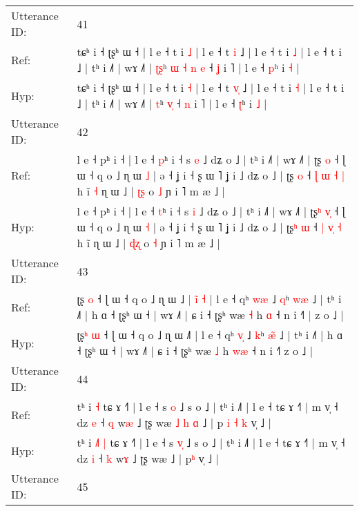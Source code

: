 \documentclass[10pt]{article}
\DeclareRobustCommand{\hl}[1]{{\textcolor{red}{#1}}}
\begin{document}
\begin{longtable}{ll}
 \\
\midrule
Utterance ID: & 41 \\
Ref: & tɕʰ i ˧ ʈʂʰ ɯ ˧ | l e ˧ t i \hl{˩} | l e ˧ t \hl{}\hl{i} ˩ | l e ˧ t i \hl{˩} | l e ˧ t i ˩ | tʰ i ˩˥ | wɤ ˩˥ | \hl{ʈ}\hl{ʂ}ʰ\hl{ }\hl{ɯ}\hl{ }\hl{˧} \hl{n}\hl{ }\hl{e} ˧ \hl{ʝ} i ˥ | l e ˧ \hl{p}ʰ i \hl{˧} |
 \\
Hyp: & tɕʰ i ˧ ʈʂʰ ɯ ˧ | l e ˧ t i \hl{˧} | l e ˧ t \hl{v}\hl{̩} ˩ | l e ˧ t i \hl{˧} | l e ˧ t i ˩ | tʰ i ˩˥ | wɤ ˩˥ | \hl{}\hl{t}ʰ\hl{}\hl{}\hl{}\hl{} \hl{}\hl{v}\hl{̩} ˧ \hl{n} i ˥ | l e ˧ \hl{ʈ}ʰ i \hl{˩} |
 \\
\midrule
Utterance ID: & 42 \\
Ref: & l e ˧ pʰ i ˧ | l e ˧ \hl{p}ʰ i ˧ s \hl{e} ˩ dʑ o ˩ | tʰ i ˩˥ | wɤ ˩˥ | ʈʂ\hl{} \hl{}\hl{o} ˧ ɭ ɯ ˧ q o ˩ ɳ ɯ \hl{˩} | ə ˧ ʝ i ˧ ʂ ɯ ˥ ʝ i ˩ dʑ o ˩ | ʈʂ\hl{} \hl{o} ˧ \hl{ɭ} \hl{ɯ}\hl{ }\hl{˧} \hl{|} h ĩ\hl{ }\hl{˧} ɳ ɯ ˩ | \hl{ʈ}\hl{ʂ} o \hl{˩} ɲ i ˥ m æ ˩ |
 \\
Hyp: & l e ˧ pʰ i ˧ | l e ˧ \hl{t}ʰ i ˧ s \hl{i} ˩ dʑ o ˩ | tʰ i ˩˥ | wɤ ˩˥ | ʈʂ\hl{ʰ} \hl{v}\hl{̩} ˧ ɭ ɯ ˧ q o ˩ ɳ ɯ \hl{˧} | ə ˧ ʝ i ˧ ʂ ɯ ˥ ʝ i ˩ dʑ o ˩ | ʈʂ\hl{ʰ} \hl{ɯ} ˧ \hl{|} \hl{}\hl{v}\hl{̩} \hl{˧} h ĩ\hl{}\hl{} ɳ ɯ ˩ | \hl{ɖ}\hl{ʐ} o \hl{˧} ɲ i ˥ m æ ˩ |
 \\
\midrule
Utterance ID: & 43 \\
Ref: & ʈʂ\hl{} \hl{o} ˧ ɭ ɯ ˧ q o ˩ ɳ ɯ ˩\hl{ }\hl{|}\hl{ }\hl{i}\hl{̃}\hl{ }\hl{˧} | l e ˧ qʰ \hl{w}\hl{æ} ˩ \hl{q}ʰ \hl{w}\hl{æ} ˩ | tʰ i ˩˥ | h ɑ ˧ ʈʂʰ ɯ ˧ | wɤ ˩˥ | ɕ i ˧ ʈʂʰ wæ \hl{˧} h \hl{}\hl{ɑ} ˧ n i ˧˥\hl{ }\hl{|} z o ˩ |
 \\
Hyp: & ʈʂ\hl{ʰ} \hl{ɯ} ˧ ɭ ɯ ˧ q o ˩ ɳ ɯ ˩\hl{}\hl{}\hl{}\hl{}\hl{}\hl{}\hl{˥} | l e ˧ qʰ \hl{v}\hl{̩} ˩ \hl{k}ʰ \hl{æ}\hl{̃} ˩ | tʰ i ˩˥ | h ɑ ˧ ʈʂʰ ɯ ˧ | wɤ ˩˥ | ɕ i ˧ ʈʂʰ wæ \hl{˩} h \hl{w}\hl{æ} ˧ n i ˧˥\hl{}\hl{} z o ˩ |
 \\
\midrule
Utterance ID: & 44 \\
Ref: & tʰ i\hl{}\hl{}\hl{} \hl{˧} tɕ ɤ ˧˥ | l e ˧ s \hl{}\hl{o} ˩ s o ˩ | tʰ i ˩˥ | l e ˧ tɕ ɤ ˧˥ | m v̩ ˧ dz \hl{e} ˧ \hl{q} w\hl{æ} ˩ ʈʂ wæ\hl{ }\hl{˩}\hl{ }\hl{h}\hl{ }\hl{ɑ} ˩ | p\hl{ }\hl{i}\hl{ }\hl{˧}\hl{ }\hl{k} v̩ ˩ |
 \\
Hyp: & tʰ i\hl{ }\hl{˩}\hl{˥} \hl{|} tɕ ɤ ˧˥ | l e ˧ s \hl{v}\hl{̩} ˩ s o ˩ | tʰ i ˩˥ | l e ˧ tɕ ɤ ˧˥ | m v̩ ˧ dz \hl{i} ˧ \hl{k} w\hl{ɤ} ˩ ʈʂ wæ\hl{}\hl{}\hl{}\hl{}\hl{}\hl{} ˩ | p\hl{}\hl{}\hl{}\hl{}\hl{}\hl{ʰ} v̩ ˩ |
 \\
\midrule
Utterance ID: & 45 \\

\end{longtable}
\end{document}
